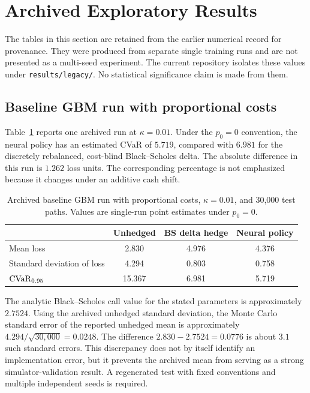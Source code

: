 \section{Archived Exploratory Results}
\label{sec:results}

The tables in this section are retained from the earlier numerical record for
provenance. They were produced from separate single training runs and are not
presented as a multi-seed experiment. The current repository isolates these
values under \texttt{results/legacy/}. No statistical significance claim is
made from them.

\subsection{Baseline GBM run with proportional costs}

Table~\ref{tab:baseline} reports one archived run at $\kappa=0.01$. Under the
$p_0=0$ convention, the neural policy has an estimated CVaR of $5.719$, compared
with $6.981$ for the discretely rebalanced, cost-blind Black--Scholes delta. The
absolute difference in this run is $1.262$ loss units. The corresponding
percentage is not emphasized because it changes under an additive cash shift.

\begin{table}[htbp]
\centering
\caption{Archived baseline GBM run with proportional costs, $\kappa=0.01$, and
30,000 test paths. Values are single-run point estimates under $p_0=0$.}
\label{tab:baseline}
\begin{tabular}{lccc}
\toprule
 & Unhedged & BS delta hedge & Neural policy \\
\midrule
Mean loss & 2.830 & 4.976 & 4.376 \\
Standard deviation of loss & 4.294 & 0.803 & 0.758 \\
$\operatorname{CVaR}_{0.95}$ & 15.367 & 6.981 & 5.719 \\
\bottomrule
\end{tabular}
\end{table}

The analytic Black--Scholes call value for the stated parameters is
approximately $2.7524$. Using the archived unhedged standard deviation, the
Monte Carlo standard error of the reported unhedged mean is approximately
$4.294/\sqrt{30,000}=0.0248$. The difference $2.830-2.7524=0.0776$ is about
$3.1$ such standard errors. This discrepancy does not by itself identify an
implementation error, but it prevents the archived mean from serving as a
strong simulator-validation result. A regenerated test with fixed conventions
and multiple independent seeds is required.

